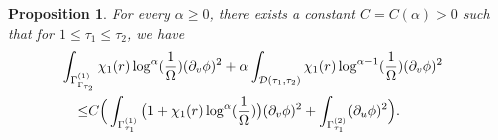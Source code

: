 \documentclass[12 pt, reqno]{amsart}
\newtheorem{proposition}[theorem]{Proposition}
\theoremstyle{definition}
\theoremstyle{remark}
\numberwithin{equation}{section}
\newcommand{\rd}{\partial}
\newcommand{\bb}{\Big}
\newcommand{\0}{\emptyset}
\newcommand{\alp}{\alpha}
\newcommand{\Gmm}{\Gamma}
\newcommand{\Omg}{\Omega}
\newcommand{\calD}{\mathcal D}
\begin{document}
\begin{proposition} \label{prop:intr:red-shift}
For every $\alp \geq 0$, there exists a constant $C = C(\alp) > 0$ such that for $1 \leq \tau_{1} \leq \tau_{2}$, we have
\begin{equation} \label{eq:intr:red-shift}
\begin{aligned}
& \hskip-2em
	\int_{\Gmm^{(1)}_{\Gmm_{\tau_{2}}}} \chi_{1}(r) \log^{\alp} (\frac{1}{\Omg}) (\rd_{v} \phi)^{2}
	+ \alp \int_{\calD(\tau_{1}, \tau_{2})} \chi_{1}(r) \log^{\alp-1} (\frac{1}{\Omg}) (\rd_{v} \phi)^{2} \\
	\leq & C \bb( \int_{\Gmm^{(1)}_{\tau_{1}}} \big( 1 + \chi_{1}(r) \log^{\alp}(\frac{1}{\Omg}) \big) (\rd_{v} \phi)^{2}
	+ \int_{\Gmm^{(2)}_{\tau_{1}}} (\rd_{u} \phi)^{2} \bb)	.
\end{aligned}
\end{equation}
\end{proposition}
\end{document}
